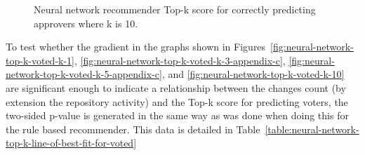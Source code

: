 \begin{figure}[H]%
    \centering
    \caption{Neural network recommender Top-k score for correctly predicting approvers where k is 10.}%
    \label{fig:neural-network-top-k-approved-k-10}%
\end{figure}

To test whether the gradient in the graphs shown in Figures~\ref{fig:neural-network-top-k-voted-k-1}, \ref{fig:neural-network-top-k-voted-k-3-appendix-c}, \ref{fig:neural-network-top-k-voted-k-5-appendix-c}, and \ref{fig:neural-network-top-k-voted-k-10} are significant enough to indicate a relationship between the changes count (by extension the repository activity) and the Top-k score for predicting voters, the two-sided p-value is generated in the same way as was done when doing this for the rule based recommender. This data is detailed in Table~\ref{table:neural-network-top-k-line-of-best-fit-for-voted}

